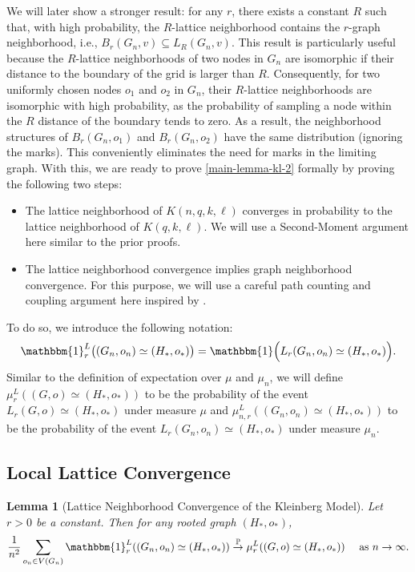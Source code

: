 \documentclass[10pt]{amsart}
\newtheorem{lemma}[theorem]{Lemma}
\begin{document}
We will later show a stronger result:  for any $r$, there exists a constant $R$ such that, with high probability, the $R$-lattice neighborhood contains the $r$-graph neighborhood, i.e., $B_r(G_n, v) \subseteq L_R(G_n, v)$. This result is particularly useful because the $R$-lattice neighborhoods of two nodes in $G_n$ are isomorphic if their distance to the boundary of the grid is larger than $R$.  Consequently, for two uniformly chosen nodes $o_1$ and $o_2$ in $G_n$, their $R$-lattice neighborhoods are isomorphic with high probability, as the probability of sampling a node within the $R$ distance of the boundary tends to zero. As a result, the neighborhood structures of $B_r(G_n, o_1)$ and $B_r(G_n, o_2)$ have the same distribution (ignoring the marks).
This conveniently eliminates the need for marks in the limiting graph. With this, we are ready to prove \eqref{main-lemma-kl-2} formally by proving the following two steps:
\begin{itemize}
     \item The lattice neighborhood of $K(n, q, k, \ell)$ converges in probability to the lattice neighborhood of $K(q, k, \ell)$. We will use a Second-Moment argument here similar to the prior proofs.
     \item The lattice neighborhood convergence implies graph neighborhood convergence. For this purpose, we will use a careful path counting and coupling argument here inspired by \cite{van2021local}.
\end{itemize}
To do so, we introduce the following notation:
\begin{align*}
    \mathbbm{1}_r^L\big((G_n,o_n)\simeq (H_*,o_*)\big)=  \mathbbm{1}\Big( L_r(G_n,o_n)\simeq (H_*,o_*)\Big).
\end{align*}
Similar to the definition of expectation over $\mu$ and $\mu_n$, we will define $\mu_r^L((G,o) \simeq  (H_*,o_*))$ to be the probability of the event $L_r(G,o)\simeq (H_*,o_*)$ under measure $\mu$ and $\mu_{n,r}^L((G_n,o_n) \simeq  (H_*,o_*))$ to be the probability of the event $L_r(G_n,o_n)\simeq (H_*,o_*)$ under measure $\mu_n$.

\subsection{Local Lattice Convergence}

\begin{lemma} [Lattice Neighborhood Convergence of the Kleinberg Model] \label{local-lattice-cv} Let \(r > 0\) be a constant. 
Then for any rooted graph $(H_*,o_*)$,
 \begin{equation*} 
    \frac{1}{n^2}\sum_{o_n\in V(G_n)}  \mathbbm{1}_r^L((G_n,o_n) \simeq (H_*,o_*) )\overset{\mathbb P}{\to}\mu_r^L((G,o) \simeq (H_*,o_*)) \quad \text{ as $n \to \infty.$}
\end{equation*} 
\end{lemma}
\end{document}
